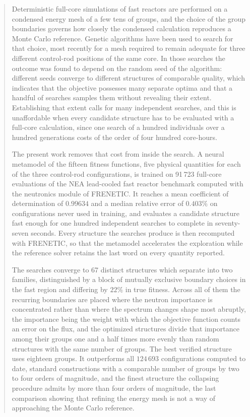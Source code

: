 \documentclass{style/nseJournal}
\begin{document}
\begin{abstract}
Deterministic full-core simulations of fast reactors are performed on a condensed
energy mesh of a few tens of groups, and the choice of the group boundaries
governs how closely the condensed calculation reproduces a Monte Carlo
reference. Genetic algorithms have been used to search for that choice, most
recently for a mesh required to remain adequate for three different control-rod
positions of the same core. In those searches the outcome was found to depend on
the random seed of the algorithm: different seeds converge to different
structures of comparable quality, which indicates that the objective possesses
many separate optima and that a handful of searches samples them without
revealing their extent. Establishing that extent calls for many independent
searches, and this is unaffordable when every candidate structure has to be
evaluated with a full-core calculation, since one search of a hundred
individuals over a hundred generations costs of the order of four hundred
core-hours.

The present work removes that cost from inside the search. A neural metamodel of
the fifteen fitness functions, five physical quantities for each of the three
control-rod configurations, is trained on 91\,723 full-core evaluations of the
NEA lead-cooled fast reactor benchmark computed with the neutronics module of
FRENETIC. It reaches a mean coefficient of determination of $0.99634$ and a
median relative error of $0.403\%$ on configurations never used in training, and
evaluates a candidate structure fast enough for one hundred independent searches
to complete in seventy-seven seconds. Every structure the searches produce is
then recomputed with FRENETIC, so that the metamodel accelerates the exploration
while the reference solver retains the last word on every quantity reported.

The searches converge to 67 distinct structures which separate into two families,
distinguished by a block of mutually exclusive boundary choices in the fast
region and differing by $22\%$ in true fitness. Across all of them the recurring
boundaries are placed where the neutron importance is concentrated rather than
where the spectrum changes shape most abruptly, the importance being the weight
with which the objective function counts an error on the flux, and the optimized
structures divide that importance among their groups one and a half times more
evenly than random structures with the same number of groups. The best verified
structure uses eighteen groups. It outperforms all $124\,693$ configurations
computed to date, standard constructions with a comparable number of groups by
two to four orders of magnitude, and the finest structure the collapsing
procedure admits by more than four orders of magnitude, the last comparison
showing that refining the energy mesh is not a way of approaching the Monte
Carlo reference.
\end{abstract}
\end{document}
